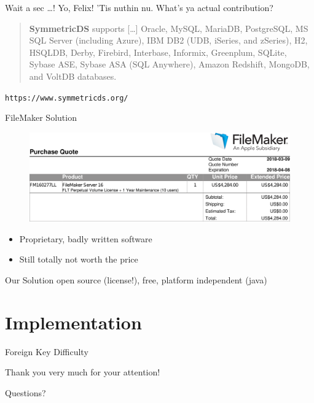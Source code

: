 \documentclass[xcolor=x11names, aspectratio=169,usenames,dvipsnames]{beamer}
\begin{document}
\begin{frame}{Wait a sec \dots!}\large
Yo, Felix! 'Tis nuthin nu. What's ya actual contribution?\pause\bigskip
\normalsize

\begin{quote}
	\textbf{SymmetricDS} supports [\dots] \alert{Oracle}, \alert{MySQL}, MariaDB, \alert{PostgreSQL}, MS SQL Server (including Azure), IBM DB2 (UDB, iSeries, and zSeries), H2, HSQLDB, Derby, Firebird, Interbase, Informix, Greenplum, SQLite, Sybase ASE, Sybase ASA (SQL Anywhere), Amazon Redshift, \alert{MongoDB}, and VoltDB databases.
\end{quote}\vspace{-1em}
\begin{flushright}
	\texttt{https://www.symmetricds.org/}
\end{flushright}
\end{frame}

\begin{frame}{FileMaker Solution}
\begin{figure}
\includegraphics[width=\linewidth]{img/order.png}
\end{figure}\vspace{-2em}
\begin{itemize}
\item Proprietary, badly written software
\item Still totally not worth the price
\end{itemize}
\end{frame}

\begin{frame}{Our Solution}
open source (license!), free, platform independent (java)
\end{frame}

\section{Implementation}

\begin{frame}{Foreign Key Difficulty}
\begin{figure}
	\begin{tikzpicture}
	
	\end{tikzpicture}
\end{figure}
\end{frame}

\begin{frame}[plain]
\vfill\vfill\vfill
\begin{center}\Large
Thank you very much for your attention!\\\bigskip

Questions?
\end{center}\vfill\vfill
\end{frame}

\maketitle
\end{document}
